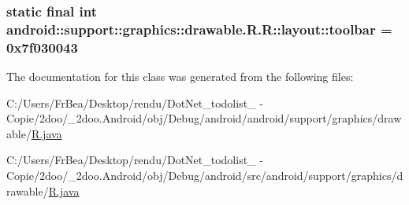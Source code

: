 \hypertarget{classandroid_1_1support_1_1graphics_1_1drawable_1_1_r_1_1layout_8457be3b327d9c8be1715a5fe04795fe}{
\subsubsection[{toolbar}]{\setlength{\rightskip}{0pt plus 5cm}static final int android::support::graphics::drawable.R.R::layout::toolbar = 0x7f030043}}
\label{classandroid_1_1support_1_1graphics_1_1drawable_1_1_r_1_1layout_8457be3b327d9c8be1715a5fe04795fe}




The documentation for this class was generated from the following files:\begin{CompactItemize}
\item 
C:/Users/FrBea/Desktop/rendu/DotNet\_\-todolist\_ - Copie/2doo/\_\-2doo.Android/obj/Debug/android/android/support/graphics/drawable/\hyperlink{android_2support_2graphics_2drawable_2_r_8java}{R.java}\item 
C:/Users/FrBea/Desktop/rendu/DotNet\_\-todolist\_ - Copie/2doo/\_\-2doo.Android/obj/Debug/android/src/android/support/graphics/drawable/\hyperlink{src_2android_2support_2graphics_2drawable_2_r_8java}{R.java}\end{CompactItemize}
